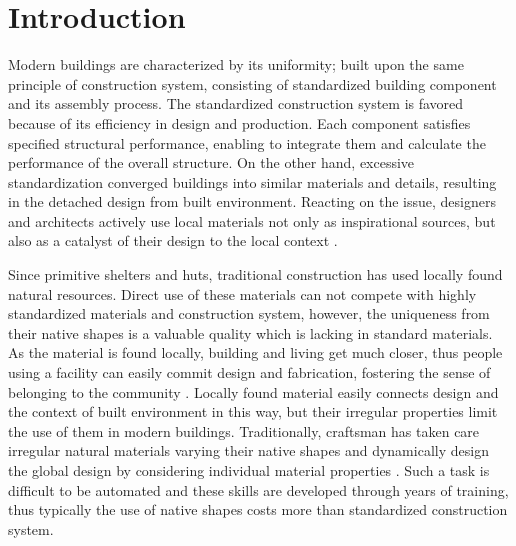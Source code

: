 \section{Introduction}
Modern buildings are characterized by its uniformity; built upon the same principle of construction system, consisting of standardized building component and its assembly process.
The standardized construction system is favored because of its efficiency in design and production.
Each component satisfies specified structural performance, enabling to integrate them and calculate the performance of the overall structure.
On the other hand, excessive standardization converged buildings into similar materials and details, resulting in the detached design from built environment.
Reacting on the issue, designers and architects actively use local materials not only as inspirational sources, but also as a catalyst of their design to the local context \cite{oliver1997encyclopedia}.

Since primitive shelters and huts, traditional construction has used locally found natural resources.
Direct use of these materials can not compete with highly standardized materials and construction system, however, the uniqueness from their native shapes is a valuable quality which is lacking in standard materials.
As the material is found locally, building and living get much closer, thus people using a facility can easily commit design and fabrication, fostering the sense of belonging to the community \cite{}. 
Locally found material easily connects design and the context of built environment in this way, but their irregular properties limit the use of them in modern buildings.
Traditionally, craftsman has taken care irregular natural materials varying their native shapes and dynamically design the global design by considering individual material properties \cite{pye1968nature}.
Such a task is difficult to be automated and these skills are developed through years of training, thus typically the use of native shapes costs more than standardized construction system. \\

